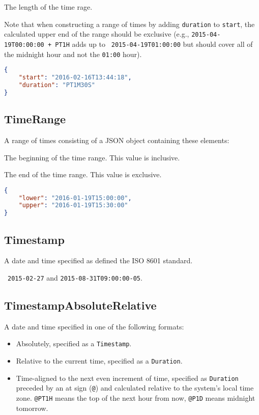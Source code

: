 \documentclass[10pt]{article}
\begin{document}
 The length of the time rage.

Note that when constructing a range of times by adding {\tt duration}
to {\tt start}, the calculated upper end of the range should be
exclusive (e.g., {\tt 2015-04-19T00:00:00 + PT1H} adds up to {\tt
  2015-04-19T01:00:00} but should cover all of the midnight hour and
not the {\tt 01:00} hour).

\example
\begin{lstlisting}[language=json]
{
    "start": "2016-02-16T13:44:18",
    "duration": "PT1M30S"
}
\end{lstlisting}


\subsection{TimeRange}
A range of times consisting of a JSON object containing these
elements:

 The beginning of the time range.  This
value is inclusive.

 The end of the time range.  This
value is exclusive.

\example
\begin{lstlisting}[language=json]
{
    "lower": "2016-01-19T15:00:00",
    "upper": "2016-01-19T15:30:00"
}
\end{lstlisting}


\subsection{Timestamp}
A date and time specified as defined the ISO 8601 standard.

\example\ {\tt 2015-02-27} and {\tt 2015-08-31T09:00:00-05}.



\subsection{TimestampAbsoluteRelative}
A date and time specified in one of the following formats:
\begin{itemize}
\item Absolutely, specified as a {\tt Timestamp}.
\item Relative to the current time, specified as a {\tt Duration}.
\item Time-aligned to the next even increment of time, specified as
  {\tt Duration} preceded by an at sign ({\tt @}) and calculated
  relative to the system's local time zone.  {\tt @PT1H} means the top
  of the next hour from now, {\tt @P1D} means midnight tomorrow.
\end{itemize}
\end{document}
